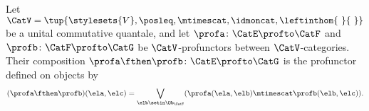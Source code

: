 \begin{ctdefinition}
    \label{def:enriched-profunctor-composition-monoidal-poset}
    Let $\CatV = \tup{\stylesets{V}, \posleq, \mtimescat, \idmoncat, \leftinthom{\ }{\ }}$ be a unital commutative quantale, and let $\profa \colon \CatE \profto \CatF$ and $\profb \colon \CatF \profto \CatG$ be $\CatV$-profunctors between $\CatV$-categories.
    Their composition $\profa \fthen \profb \colon \CatE \profto \CatG$ is the profunctor defined on objects by
    \begin{equation}
        (\profa \fthen \profb)(\ela, \elc) = \bigvee_{\elb \setin \Ob_\CatF} (\profa (\ela, \elb) \mtimescat \profb (\elb, \elc)).
    \end{equation}
\end{ctdefinition}

